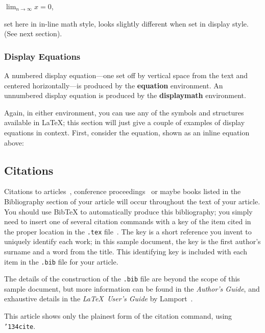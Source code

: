 \documentclass[sigconf]{acmart}
\begin{document}
\begin{math}
  \lim_{n\rightarrow \infty}x=0
\end{math},

set here in in-line math style, looks slightly different when
set in display style.  (See next section).

\subsubsection{Display Equations}

A numbered display equation---one set off by vertical space from the
text and centered horizontally---is produced by the \textbf{equation}
environment. An unnumbered display equation is produced by the
\textbf{displaymath} environment.

Again, in either environment, you can use any of the symbols
and structures available in \LaTeX\@; this section will just
give a couple of examples of display equations in context.
First, consider the equation, shown as an inline equation above:

\subsection{Citations}

Citations to articles~\cite{bowman:reasoning, clark:pct, braams:babel,
  herlihy:methodology}, conference proceedings~\cite{clark:pct} or
maybe books \cite{Lamport:LaTeX, salas:calculus} listed in the
Bibliography section of your article will occur throughout the text of
your article.  You should use BibTeX to automatically produce this
bibliography; you simply need to insert one of several citation
commands with a key of the item cited in the proper location in the
\texttt{.tex} file~\cite{Lamport:LaTeX}.  The key is a short reference
you invent to uniquely identify each work; in this sample document,
the key is the first author's surname and a word from the title.  This
identifying key is included with each item in the \texttt{.bib} file
for your article.

The details of the construction of the \texttt{.bib} file are beyond
the scope of this sample document, but more information can be found
in the \textit{Author's Guide}, and exhaustive details in the
\textit{\LaTeX\ User's Guide} by Lamport~.

This article shows only the plainest form of the citation command,
using \texttt{{\char'134}cite}.
\end{document}
